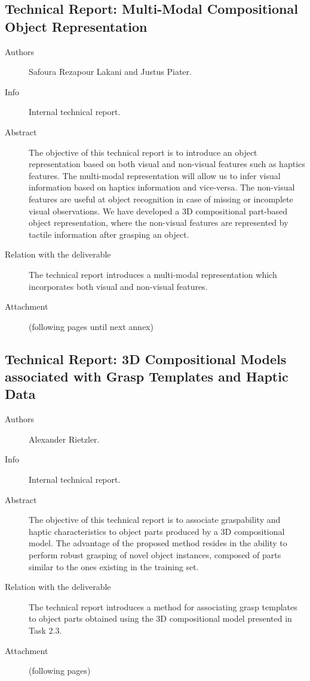 \documentclass[a4paper,11pt,pdf]{pacmanreport}
\begin{document}
\subsection{Technical Report: Multi-Modal Compositional Object Representation} \label{ann:techReport}
\begin{description}
\item[Authors] Safoura Rezapour Lakani and Justus Piater.
\item[Info] Internal technical report.
\item[Abstract] The objective of this technical report is to introduce an object representation based on both visual and non-visual features such as haptics features. The multi-modal representation will allow us to infer visual information based on haptics information and vice-versa. The non-visual features are useful at object recognition in case of missing or incomplete visual observations. We have developed a 3D compositional part-based object representation, where the non-visual features are represented by tactile information after grasping an object.
\item[Relation with the deliverable] The technical report introduces a multi-modal representation which incorporates both visual and non-visual features.
\item[Attachment] (following pages until next annex) 
\end{description}


\subsection{Technical Report: 3D Compositional Models associated with Grasp Templates and Haptic Data} \label{ann:techReportAlex}
\begin{description}
\item[Authors] Alexander Rietzler.
\item[Info] Internal technical report.
\item[Abstract] The objective of this technical report is to associate graspability and haptic characteristics to object parts produced by a 3D compositional model. The advantage of the proposed method resides in the ability to perform robust grasping of novel object instances, composed of parts similar to the ones existing in the training set.
\item[Relation with the deliverable] The technical report introduces a method for associating grasp templates to object parts obtained using the 3D compositional model presented in Task 2.3.
\item[Attachment] (following pages) 
\end{description}

\end{document}
